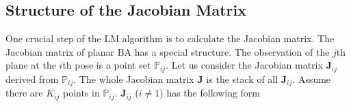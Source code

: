 \documentclass{vgtc}                          %
\newcommand\overmat[2]{%
			\smash{\overbrace{{%
			\begin{matrix}#2\end{matrix}}}^{\text{\color{black}#1}}}\vphantom{#2}}
\begin{document}
\subsection{Structure of the  Jacobian Matrix }
One crucial step of the LM algorithm is to calculate the Jacobian matrix. The Jacobian matrix of planar BA has a special structure. The observation of the $j$th plane at the $i$th pose is a point set $\mathbb{P}_{ij}$.   Let us consider the Jacobian matrix $\mathbf{J}_{ij}$ derived from   $\mathbb{P}_{ij}$. The whole Jacobian matrix $\mathbf{J}$ is the stack of all $\mathbf{J}_{ij}$. Assume there are  $K_{ij}$ points in $\mathbb{P}_{ij}$.  $\mathbf{J}_{ij}$ ($ i \neq 1$) has the following form 
\end{document}
